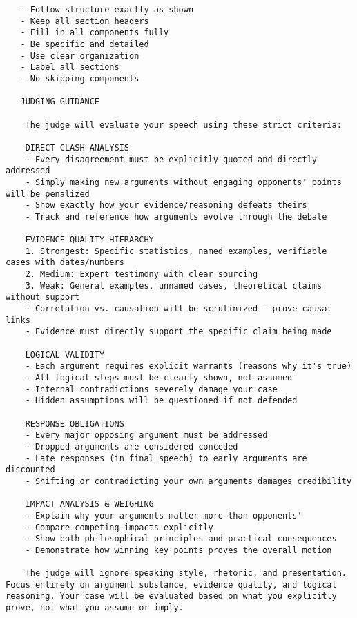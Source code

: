 \documentclass{article}
\begin{document}
\begin{verbatim}
   - Follow structure exactly as shown
   - Keep all section headers
   - Fill in all components fully
   - Be specific and detailed
   - Use clear organization
   - Label all sections
   - No skipping components

   JUDGING GUIDANCE

    The judge will evaluate your speech using these strict criteria:

    DIRECT CLASH ANALYSIS
    - Every disagreement must be explicitly quoted and directly addressed
    - Simply making new arguments without engaging opponents' points will be penalized
    - Show exactly how your evidence/reasoning defeats theirs
    - Track and reference how arguments evolve through the debate

    EVIDENCE QUALITY HIERARCHY
    1. Strongest: Specific statistics, named examples, verifiable cases with dates/numbers
    2. Medium: Expert testimony with clear sourcing
    3. Weak: General examples, unnamed cases, theoretical claims without support
    - Correlation vs. causation will be scrutinized - prove causal links
    - Evidence must directly support the specific claim being made

    LOGICAL VALIDITY
    - Each argument requires explicit warrants (reasons why it's true)
    - All logical steps must be clearly shown, not assumed
    - Internal contradictions severely damage your case
    - Hidden assumptions will be questioned if not defended

    RESPONSE OBLIGATIONS
    - Every major opposing argument must be addressed
    - Dropped arguments are considered conceded
    - Late responses (in final speech) to early arguments are discounted
    - Shifting or contradicting your own arguments damages credibility

    IMPACT ANALYSIS & WEIGHING
    - Explain why your arguments matter more than opponents'
    - Compare competing impacts explicitly
    - Show both philosophical principles and practical consequences
    - Demonstrate how winning key points proves the overall motion

    The judge will ignore speaking style, rhetoric, and presentation. Focus entirely on argument substance, evidence quality, and logical reasoning. Your case will be evaluated based on what you explicitly prove, not what you assume or imply.

  \end{verbatim}
\end{document}
